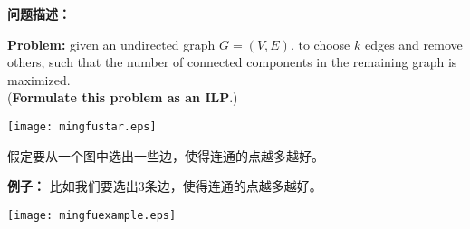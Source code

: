 \textbf{问题描述：}

\vspace{-0.3cm}

	{\bf Problem:} given an undirected graph $G=(V,E)$, to choose $k$ edges and remove others,
	such that the number of connected components in the remaining graph is maximized. \\
	({\bf Formulate this problem as an ILP}.)

	\vspace{0.6cm}

	\begin{center}
	\texttt{[image: mingfustar.eps]}
	\end{center}

假定要从一个图中选出一些边，使得连通的点越多越好。

\textbf{例子：}
比如我们要选出3条边，使得连通的点越多越好。

\begin{center}
	\texttt{[image: mingfuexample.eps]}
\end{center}

